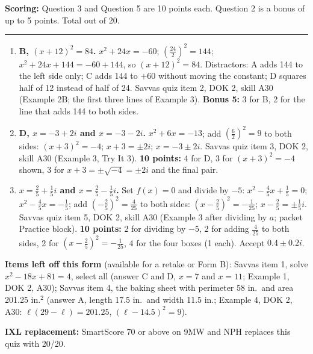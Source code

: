 \documentclass[11pt]{article}
\begin{document}
\vfill
\noindent\textbf{Scoring:} Question 3 and Question 5 are 10 points each. Question 2 is a bonus of up to 5 points. Total out of 20.

\newpage
{}

\vspace{4pt}\noindent\rule{\textwidth}{0.6pt}

\begin{enumerate}
\item[\textbf{2.}] \textbf{B, $(x+12)^2=84$.} $x^2+24x=-60$; $\left(\frac{24}{2}\right)^2=144$; $x^2+24x+144=-60+144$, so $(x+12)^2=84$. Distractors: A adds 144 to the left side only; C adds 144 to $+60$ without moving the constant; D squares half of 12 instead of half of 24. Savvas quiz item 2, DOK 2, skill A30 (Example 2B; the first three lines of Example 3). \textbf{Bonus 5:} 3 for B, 2 for the line that adds 144 to both sides.
\item[\textbf{3.}] \textbf{D, $x=-3+2i$ and $x=-3-2i$.} $x^2+6x=-13$; add $\left(\frac{6}{2}\right)^2=9$ to both sides: $(x+3)^2=-4$; $x+3=\pm2i$; $x=-3\pm2i$. Savvas quiz item 3, DOK 2, skill A30 (Example 3, Try It 3). \textbf{10 points:} 4 for D, 3 for $(x+3)^2=-4$ shown, 3 for $x+3=\pm\sqrt{-4}=\pm2i$ and the final pair.
\item[\textbf{5.}] \textbf{$x=\frac25+\frac15i$ and $x=\frac25-\frac15i$.} Set $f(x)=0$ and divide by $-5$: $x^2-\frac45x+\frac15=0$; $x^2-\frac45x=-\frac15$; add $\left(-\frac25\right)^2=\frac{4}{25}$ to both sides: $\left(x-\frac25\right)^2=-\frac{1}{25}$; $x-\frac25=\pm\frac15i$. Savvas quiz item 5, DOK 2, skill A30 (Example 3 after dividing by $a$; packet Practice block). \textbf{10 points:} 2 for dividing by $-5$, 2 for adding $\frac{4}{25}$ to both sides, 2 for $\left(x-\frac25\right)^2=-\frac1{25}$, 4 for the four boxes (1 each). Accept $0.4\pm0.2i$.
\end{enumerate}

\textbf{Items left off this form} (available for a retake or Form B): Savvas item 1, solve $x^2-18x+81=4$, select all (answer C and D, $x=7$ and $x=11$; Example 1, DOK 2, A30); Savvas item 4, the baking sheet with perimeter 58 in.\ and area 201.25 in.$^2$ (answer A, length 17.5 in.\ and width 11.5 in.; Example 4, DOK 2, A30: $\ell(29-\ell)=201.25$, $(\ell-14.5)^2=9$).

\textbf{IXL replacement:} SmartScore 70 or above on 9MW and NPH replaces this quiz with 20/20.
\end{document}
